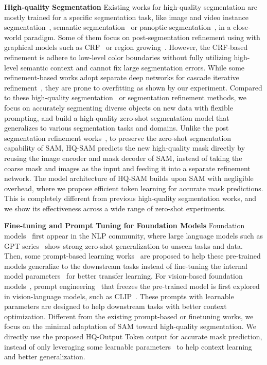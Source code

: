 \textbf{High-quality Segmentation}  Existing works for high-quality segmentation are mostly trained for a specific segmentation task, like image and video instance segmentation~\cite{kirillov2020pointrend,transfiner,vmt,tang2021look,wen2023patchdct}, semantic segmentation~\cite{lin2017refinenet,zhao2018icnet,takikawa2019gated,yuan2020segfix} or panoptic segmentation~\cite{de2023intra}, in a close-world paradigm. Some of them focus on post-segmentation refinement using with graphical models such as CRF~\cite{krahenbuhl2011efficient} or region growing~\cite{dias2019semantic}. However, the CRF-based refinement is adhere to low-level color boundaries without fully utilizing high-level semantic context and cannot fix large segmentation errors. While some refinement-based works adopt separate deep networks for cascade iterative refinement~\cite{cascadepsp,shen2022high}, they are prone to overfitting as shown by our experiment. Compared to these high-quality segmentation~\cite{transfiner,kirillov2020pointrend,qilu2022finegrained} or segmentation refinement methods, we focus on accurately segmenting diverse objects on new data with flexible prompting, and build a high-quality zero-shot segmentation model that generalizes to various segmentation tasks and domains. Unlike the post segmentation refinement works~\cite{cascadepsp,shen2022high}, to preserve the zero-shot segmentation capability of SAM, HQ-SAM predicts the new high-quality mask directly by reusing the image encoder and mask decoder of SAM, instead of taking the coarse mask and images as the input and feeding it into a separate refinement network. The model architecture of HQ-SAM builds upon SAM with negligible overhead, where we propose efficient token learning for accurate mask predictions. This is completely different from previous high-quality segmentation works, and we show its effectiveness across a wide range of zero-shot experiments.

\textbf{Fine-tuning and Prompt Tuning for Foundation Models} Foundation models~\cite{brown2020language,bommasani2021opportunities} first appear in the NLP community, where large language models such as GPT series~\cite{brown2020language} show strong zero-shot generalization to unseen tasks and data. Then, some prompt-based learning works~\cite{houlsby2019parameter,li2021prefix,hu2021lora} are proposed to help these pre-trained models generalize to the downstream tasks instead of fine-tuning the internal model parameters~\cite{hinterstoisser2018pre} for better transfer learning. For vision-based foundation models~\cite{sam,seggpt,zou2023segment}, prompt engineering~\cite{zhou2022coop,xing2022class,yao2021cpt,zhou2022zegclip} that freezes the pre-trained model is first explored in vision-language models, such as CLIP~\cite{clip}. These prompts with learnable parameters are designed to help downstream tasks with better context optimization. Different from the existing prompt-based or finetuning works, we focus on the minimal adaptation of SAM toward high-quality segmentation. We directly use the proposed HQ-Output Token output for accurate mask prediction, instead of only leveraging some learnable parameters~\cite{zhou2022coop} to help context learning and better generalization. 

